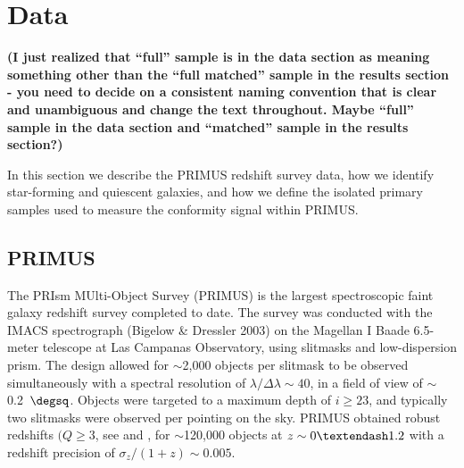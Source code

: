 
\section{Data}\label{sec:data}


{\bf(I just realized that “full” sample is in the data section as meaning something other than the “full matched” sample in the results section - you need to decide on a consistent naming convention that is clear and unambiguous and change the text throughout.  Maybe ``full'' sample in the data section and ``matched'' sample in the results section?)}

In this section we describe the PRIMUS redshift survey data, how we identify star-forming
and quiescent galaxies, and how we define the isolated primary samples used to measure 
the conformity signal within PRIMUS.


\subsection{PRIMUS}\label{sec:PRIMUS}
 
The PRIsm MUlti-Object Survey (PRIMUS) is the largest spectroscopic faint galaxy redshift survey completed to date.
The survey was conducted with the IMACS spectrograph (Bigelow \& Dressler 2003) on the Magellan I Baade 6.5-meter telescope at 
Las Campanas 
Observatory, using slitmasks and low-dispersion prism.
The design allowed for $\sim$2,000 objects per slitmask to be observed simultaneously with a spectral resolution of ${\lambda/\Delta
\lambda \sim 40}$, in 
a field of view of $\sim$0.2~$\degsq$.
Objects were targeted to a maximum depth of ${i \ge 23}$, and typically two slitmasks were observed per pointing on the sky.  
PRIMUS obtained robust redshifts $({Q \ge 3}$, see \citet{Coil11} and \citet{Cool13}, for $\sim$120,000 objects at ${z \sim 
0\textendash1.2}$ with a 
redshift precision of ${\sigma_{z}/(1 + z) \sim 0.005}$.


